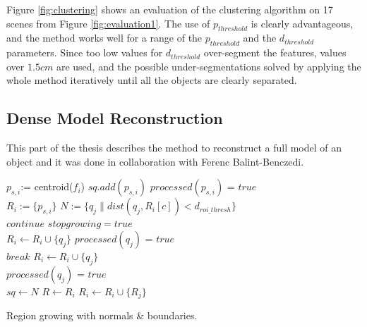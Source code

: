  Figure \ref{fig:clustering} 
shows an evaluation of the clustering algorithm on 17 scenes from Figure \ref{fig:evaluation1}.
 The use of $p_{threshold}$ is clearly advantageous, and the method works well for a range of the $p_{threshold}$ and the $d_{threshold}$ parameters. 
 Since too low values for $d_{threshold}$ over-segment the features, values over $1.5cm$ are used, and the possible under-segmentations solved
 by applying the whole method iteratively until all the objects are clearly separated.
 




 

\subsection{Dense Model Reconstruction}
\label{sec:dense_model}
 This part of the thesis describes the method to reconstruct a full model of an object and it was done in collaboration with Ferenc Balint-Benczedi.
\begin{algorithm}[htb!]\footnotesize
   {
    $p_{s,i} $:= centroid($f_i$)
    $sq.add(p_{s,i})$
    $processed(p_{s,i})$ = $true$ \\
    $R_i := \{p_{s,i}\}$
    {
      $N := \{q_j \| dist(q_j, R_i[c]) < d_{roi\_thresh}\}$\\
      {
	{
	$continue$
	}
	{
	$stopgrowing =true$\\
	$R_i \leftarrow R_i \cup \{q_j\}$
	$processed(q_j)$ = $true$ \\
	$break$
	}
	{
	 $R_i \leftarrow R_i \cup \{q_j\}$\\
	 $processed(q_j)$ = $true$ \\
	}
      }
	{
	$sq \leftarrow N$
	}
    }
    {$R \leftarrow R_i$}
   }
  {
	{$R_i \leftarrow R_i \cup \{R_j\}$}
  }
  \caption{Region growing with normals \& boundaries.}
  \label{alg:region_growing}
\end{algorithm}

